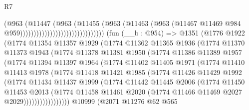 \begin{lexlean}{R7}
\begin{coremodule}
                                                  (@963
                                                    (@11447
                                                      (@963
                                                        (@11455
                                                          (@963
                                                            (@11463
                                                              (@963
                                                                (@11467
                                                                  @11469
                                                                  @984
                                                                  @959)))))))))))))))))))))))))))))))
    (fun (__b : @954) =>
    @1351
      (@1776
        @1922
        (@1774
          @11354
          @11357
          @1929
          (@1774
            @11362
            @11365
            @1936
            (@1774
              @11370
              @11373
              @1943
              (@1774
                @11378
                @11381
                @1950
                (@1774
                  @11386
                  @11389
                  @1957
                  (@1774
                    @11394
                    @11397
                    @1964
                    (@1774
                      @11402
                      @11405
                      @1971
                      (@1774
                        @11410
                        @11413
                        @1978
                        (@1774
                          @11418
                          @11421
                          @1985
                          (@1774
                            @11426
                            @11429
                            @1992
                            (@1774
                              @11434
                              @11437
                              @1999
                              (@1774
                                @11442
                                @11445
                                @2006
                                (@1774
                                  @11450
                                  @11453
                                  @2013
                                  (@1774
                                    @11458
                                    @11461
                                    @2020
                                    (@1774 @11466 @11469 @2027 @2029)))))))))))))))))
    @10999
    (@2071
      @11276
      @62
      @565

\end{coremodule}
\end{lexlean}
